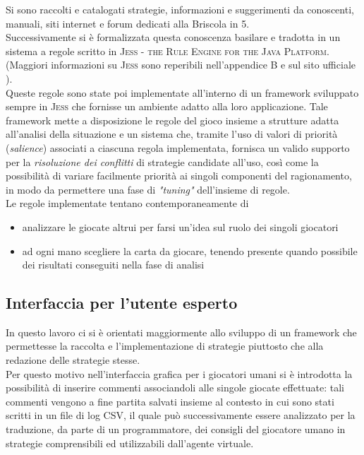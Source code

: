Si sono raccolti e catalogati strategie, informazioni e suggerimenti da conoscenti, manuali, siti internet e forum dedicati alla Briscola in 5.\\
Successivamente si è formalizzata questa conoscenza basilare e tradotta in un sistema a regole scritto in \textsc{Jess -  the Rule Engine for the Java Platform}. (Maggiori informazioni su \textsc{Jess} sono reperibili nell'appendice B e sul sito ufficiale \cite{jess}).\\
Queste regole sono state poi implementate all'interno di un framework sviluppato sempre in \textsc{Jess} che fornisse un ambiente adatto alla loro applicazione.
Tale framework mette a disposizione le regole del gioco insieme a strutture adatta all'analisi della situazione e un sistema che, tramite l'uso di valori di priorità (\emph{salience}) associati a ciascuna regola implementata, fornisca un valido supporto per la \emph{risoluzione dei conflitti} di strategie candidate all'uso, così come la possibilità di variare facilmente priorità ai singoli componenti del ragionamento, in modo da permettere una fase di \emph{"tuning"} dell'insieme di regole.\\
Le regole implementate tentano contemporaneamente di 
\begin{itemize}
  \item analizzare le giocate altrui per farsi un'idea sul ruolo dei singoli giocatori
  \item ad ogni mano scegliere la carta da giocare, tenendo presente quando possibile dei risultati conseguiti nella fase di analisi 
\end{itemize}

\subsection{Interfaccia per l'utente esperto}
In questo lavoro ci si è orientati maggiormente allo sviluppo di un framework che permettesse la raccolta e l'implementazione di strategie piuttosto che alla redazione delle strategie stesse.\\
Per questo motivo nell'interfaccia grafica per i giocatori umani si è introdotta la possibilità di inserire commenti associandoli alle singole giocate effettuate: tali commenti vengono a fine partita salvati insieme al contesto in cui sono stati scritti in un file di log CSV, il quale può successivamente essere analizzato per la traduzione, da parte di un programmatore, dei consigli del giocatore umano in strategie comprensibili ed utilizzabili dall'agente virtuale.
